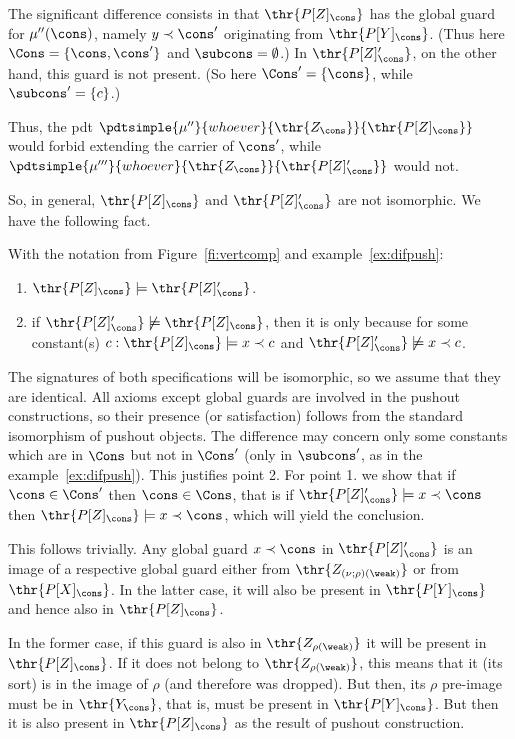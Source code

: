 \begin{example}
The significant difference consists in that  $\thr{P[Z]_\cons}$  has the
global guard for $\mu''(\cons)$, namely $y\prec\cons'$ originating from
$\thr{P[Y]_\cons}$. (Thus here $\Cons=\{\cons,\cons'\}$ and $\subcons=\emptyset$.)
In $\thr{P[Z]'_\cons}$, on the other hand, this guard is
not present. (So here $\Cons'= \{\cons\}$, while ${\subcons}'=\{c\}$.)

Thus, the pdt
$\pdtsimple{\mu''}{whoever}{\thr{Z_\cons}}{\thr{P[Z]_\cons}}$ would forbid
extending the carrier of $\cons'$, while
$\pdtsimple{\mu'''}{whoever}{\thr{Z_\cons}}{\thr{P[Z]'_\cons}}$ would not.
\end{example}
%
So, in general, $\thr{P[Z]_\cons}$
and $\thr{P[Z]'_\cons}$ are not isomorphic. We have the following fact.
\begin{fact}\label{fa:pzpz}
With the notation from Figure~\ref{fi:vertcomp} and
example~\ref{ex:difpush}:
\begin{enumerate}\MyLPar
\item $\thr{P[Z]_\cons}\models \thr{P[Z]'_\cons}$.
\item if $\thr{P[Z]'_\cons}\not\models \thr{P[Z]_\cons}$, then it is only
because for some constant(s) $c: \thr{P[Z]_\cons}\models x\prec c$ and
$\thr{P[Z]'_\cons}\not\models x\prec c$. 
\end{enumerate}
\end{fact}
\begin{PROOF}
The signatures of both specifications will be isomorphic, so we assume that they are
identical. All axioms except global guards are involved in the pushout
constructions, so their presence (or satisfaction) follows from the standard
isomorphism of pushout objects. The difference may concern only some constants which are in $\Cons$ but
not in $\Cons'$ (only in ${\subcons}'$, as in the
example~\ref{ex:difpush}). This justifies point 2.
For point 1. we show that if $\cons\in\Cons'$ then
$\cons\in\Cons$, that is if $\thr{P[Z]'_\cons}\models x\prec\cons$ then
$\thr{P[Z]_\cons}\models x\prec\cons$, which will yield the conclusion.

This follows trivially. Any global guard $x\prec\cons$ in $\thr{P[Z]'_\cons}$
is an image of a respective global guard either from
$\thr{Z_{(\nu;\rho)(\weak)}}$ or from $\thr{P[X]_\cons}$. In the latter case,
it will also be present in $\thr{P[Y]_\cons}$ and hence also in
$\thr{P[Z]_\cons}$. 

In the former case, if this guard is also in $\thr{Z_{\rho(\weak)}}$ it will
be present in $\thr{P[Z]_\cons}$. If it does not belong to
$\thr{Z_{\rho(\weak)}}$, this means that it (its sort) is in the image of
$\rho$ (and therefore was dropped). But then, its $\rho$ pre-image must be in
$\thr{Y_\cons}$, that is, must be present in $\thr{P[Y]_\cons}$. But then it
is also present in $\thr{P[Z]_\cons}$ as the result of pushout construction.
\end{PROOF}
